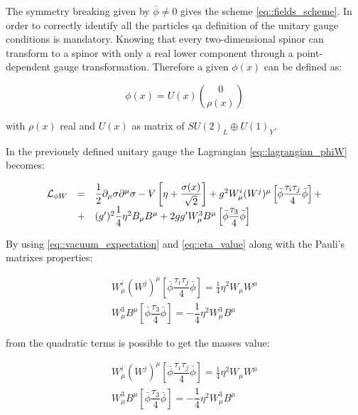The symmetry breaking given by $\bar{\phi} \neq 0$ gives the scheme \ref{eq::fields_scheme}.
In order to correctly identify all the particles qa definition of the unitary gauge conditions is mandatory. Knowing that every two-dimensional spinor can transform to a spinor with only a real lower component through a point-dependent gauge transformation. Therefore a given $\phi(x)$
can be defined as:

\begin{equation}
\phi(x) = U(x) \binom{0}{\rho(x)}
\end{equation}

with $\rho(x)$ real and $U(x)$ as matrix of $ SU(2)_{L} \oplus U(1)_{Y}$. 

In the previously defined unitary gauge the Lagrangian \ref{eq::lagrangian_phiW} becomes:

\begin{equation}
\begin{array}{r c l}
\mathcal{L}_{\phi W}&=&\dfrac{1}{2} \partial_{\mu} \sigma \partial^{\mu} \sigma - V \left[ \eta + \dfrac{\sigma(x)}{\sqrt{2}}\right] + g^{2} W_{\mu}^{i}(W^{j})^{\mu} \left[ \bar{\phi} \dfrac{\tau_{i}\tau_{j}}{4}\bar{\phi}\right] +\\
&+&(g^{\prime})^{2} \dfrac{1}{4}\eta^{2} B_{\mu} B^{\mu} + 2 gg^{\prime} W^{3}_{\mu} B^{\mu} \left[ \bar{\phi} \dfrac{\tau_{3}}{4} \bar{\phi} \right]
\end{array}
\end{equation}

By using  \ref{eq::vacuum_expectation} and \ref{eq::eta_value} along with the Pauli's matrixes properties:

\begin{equation}
\begin{array}{c}
 W_{\mu}^{i}(W^{j})^{\mu} \left[ \bar{\phi} \dfrac{\tau_{i}\tau_{j}}{4}\bar{\phi}\right] = \frac{1}{4}\eta^{2} W_{\mu}W^{\mu} \\

 W^{3}_{\mu} B^{\mu} \left[ \bar{\phi} \dfrac{\tau_{3}}{4} \bar{\phi} \right] = - \dfrac{1}{4} \eta^{2} W^{3}_{\mu}B^{\mu}
 \end{array}
\end{equation}

from the quadratic terms is possible to get the masses value:

\begin{equation}
\begin{array}{c}
W_{\mu}^{i}(W^{j})^{\mu} \left[ \bar{\phi} \dfrac{\tau_{i}\tau_{j}}{4}\bar{\phi}\right] = \frac{1}{4}\eta^{2} W_{\mu}W^{\mu} \\

W^{3}_{\mu} B^{\mu} \left[ \bar{\phi} \dfrac{\tau_{3}}{4} \bar{\phi} \right] = - \dfrac{1}{4} \eta^{2} W^{3}_{\mu}B^{\mu}
\end{array}
\end{equation}

